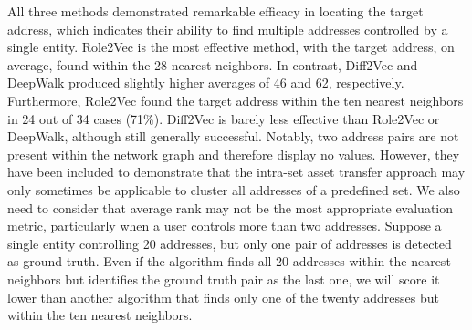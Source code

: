 \documentclass[12pt,a4paper,titlepage,oneside,english]{article}
\begin{document}
All three methods demonstrated remarkable efficacy in locating the target address, which indicates their ability to find multiple addresses controlled by a single entity.
Role2Vec is the most effective method, with the target address, on average, found within the 28 nearest neighbors. In contrast, Diff2Vec and DeepWalk produced slightly higher averages of 46 and 62, respectively. Furthermore, Role2Vec found the target address within the ten nearest neighbors in 24 out of 34 cases (71\%). Diff2Vec is barely less effective than Role2Vec or DeepWalk, although still generally successful. \newline
Notably, two address pairs are not present within the network graph and therefore display no values. However, they have been included to demonstrate that the intra-set asset transfer approach may only sometimes be applicable to cluster all addresses of a predefined set. \newline
We also need to consider that average rank may not be the most appropriate evaluation metric, particularly when a user controls more than two addresses. Suppose a single entity controlling 20 addresses, but only one pair of addresses is detected as ground truth. Even if the algorithm finds all 20 addresses within the nearest neighbors but identifies the ground truth pair as the last one, we will score it lower than another algorithm that finds only one of the twenty addresses but within the ten nearest neighbors.

\end{document}
